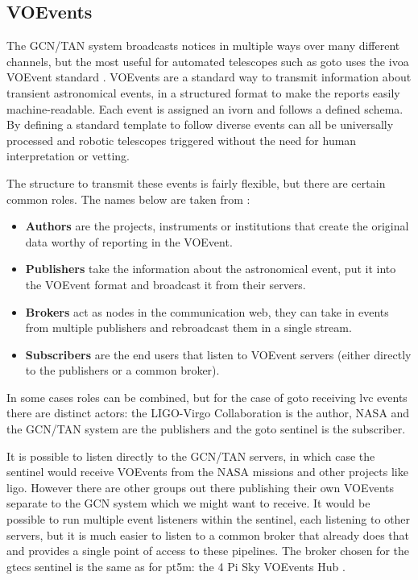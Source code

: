 \begin{colsection}
\begin{colsection}
\end{colsection}


\subsection{VOEvents}
\label{sec:voevents}
\begin{colsection}

The GCN/TAN system broadcasts notices in multiple ways over many different channels, but the most useful for automated telescopes such as \gls{goto} uses the \gls{ivoa} VOEvent standard \citep{voevent}. VOEvents are a standard way to transmit information about transient astronomical events, in a structured format to make the reports easily machine-readable. Each event is assigned an \gls{ivorn} and follows a defined schema. By defining a standard template to follow diverse events can all be universally processed and robotic telescopes triggered without the need for human interpretation or vetting.

The structure to transmit these events is fairly flexible, but there are certain common roles. The names below are taken from \citet{voevent}:

\begin{itemize}
    \item \textbf{Authors} are the projects, instruments or institutions that create the original data worthy of reporting in the VOEvent.
    \item \textbf{Publishers} take the information about the astronomical event, put it into the VOEvent format and broadcast it from their servers.
    \item \textbf{Brokers} act as nodes in the communication web, they can take in events from multiple publishers and rebroadcast them in a single stream.
    \item \textbf{Subscribers} are the end users that listen to VOEvent servers (either directly to the publishers or a common broker).
\end{itemize}

In some cases roles can be combined, but for the case of \gls{goto} receiving \gls{lvc} events there are distinct actors: the LIGO-Virgo Collaboration is the author, NASA and the GCN/TAN system are the publishers and the \gls{goto} sentinel is the subscriber.

It is possible to listen directly to the GCN/TAN servers, in which case the sentinel would receive VOEvents from the NASA missions and other projects like \gls{ligo}. However there are other groups out there publishing their own VOEvents separate to the GCN system which we might want to receive. It would be possible to run multiple event listeners within the sentinel, each listening to other servers, but it is much easier to listen to a common broker that already does that and provides a single point of access to these pipelines. The broker chosen for the \gls{gtecs} sentinel is the same as for pt5m: the 4 Pi Sky VOEvents Hub \citep{4pisky}.


\end{colsection}
\end{colsection}

